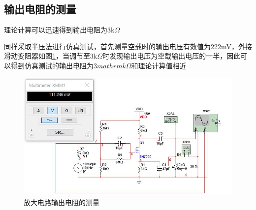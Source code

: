 \documentclass[UTF8,a4paper]{ctexart}
\begin{document}
\subsection{输出电阻的测量}
理论计算可以迅速得到输出电阻为$3\mathrm{k}\Omega$

同样采取半压法进行仿真测试，首先测量空载时的输出电压有效值为222mV，外接滑动变阻器如图\ref{MOSro}，当调节至3$\mathrm{k}\Omega$时发现输出电压为空载输出电压的一半，因此可以得到仿真测试的输出电阻为3$mathrm{k}\Omega$和理论计算值相近
\begin{figure}
\centering
\includegraphics[width=\textwidth]{2-4Ro.jpg}
\caption{放大电路输出电阻的测量}
\label{MOSro}
\end{figure}
\end{document}
